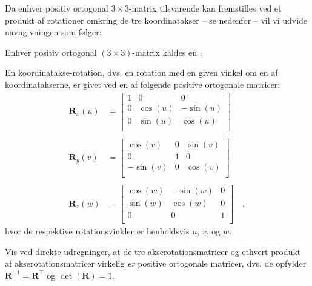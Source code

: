Da enhver positiv ortogonal  $3 \times 3$-matrix tilsvarende kan fremstilles ved et produkt af rotationer omkring de tre koordinatakser -- se nedenfor -- vil vi udvide navngivningen som følger:

\begin{definition} \label{defRotmat}
Enhver positiv ortogonal $(3 \times 3)$-matrix kaldes en .
\end{definition}


En koordinatakse-rotation, dvs. en rotation med en given vinkel om en af koordinatakserne, er givet ved en af følgende positive ortogonale matricer:
\begin{equation} \label{eqRxRyRz}
\begin{aligned}
\mathbf{R}_{x}(u) &= \left[
                   \begin{array}{ccc}
                     1 & 0 & 0 \\
                     0 & \cos(u) & -\sin(u) \\
                     0 & \sin(u) & \cos(u) \\
                   \end{array}
                 \right] \\ \\
\mathbf{R}_{y}(v) &= \left[
                   \begin{array}{ccc}
                     \cos(v) & 0 & \sin(v) \\
                     0 & 1 & 0 \\
                     -\sin(v) & 0 & \cos(v) \\
                   \end{array}
                 \right] \\ \\
\mathbf{R}_{z}(w) &= \left[
                   \begin{array}{ccc}
                     \cos(w) & -\sin(w) & 0 \\
                     \sin(w) & \cos(w) & 0 \\
                     0 & 0 & 1 \\
                   \end{array}
                 \right] \quad ,
\end{aligned}
\end{equation}
hvor de respektive rotationsvinkler er henholdsvis $u$, $v$, og $w$.

\begin{exercise}
Vis ved direkte udregninger, at de tre akserotationsmatricer og ethvert produkt af akserotationsmatricer virkelig \emph{er} positive ortogonale matricer, dvs. de opfylder $\mathbf{R}^{-1} = \mathbf{R}^{\top}$ og  $\det(\mathbf{R}) = 1 $.
\end{exercise}

